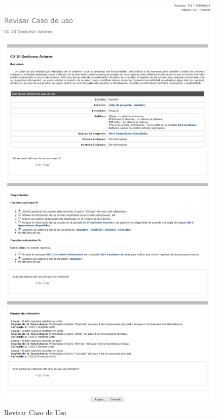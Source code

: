 \begin{enumerate}
			\begin{figure}[htbp!]
				\begin{center}
					\includegraphics[scale=0.45]{roles/lider/casosUso/pantallas/IU6-4revisarCU}
					\caption{Revisar Caso de Uso}
					\label{fig:RevisarCU}
				\end{center}
			\end{figure}
		

\end{enumerate}
